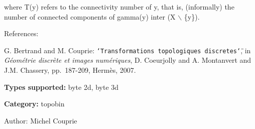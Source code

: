 where T(y) refers to the connectivity number of y, that is, (informally) the number of connected components of gamma(y) inter (X $\backslash$ \{y\}).

References:\par
 [BC07] G. Bertrand and M. Couprie: {\tt \char`\"{}Transformations topologiques discretes\char`\"{}}, in {\em G\'{e}om\'{e}trie discr\`{e}te et images num\'{e}riques\/}, D. Coeurjolly and A. Montanvert and J.M. Chassery, pp.~187-209, Herm\`{e}s, 2007.\par


{\bf Types supported:} byte 2d, byte 3d

{\bf Category:} topobin

\begin{Desc}
\item[Author:]Michel Couprie \end{Desc}
